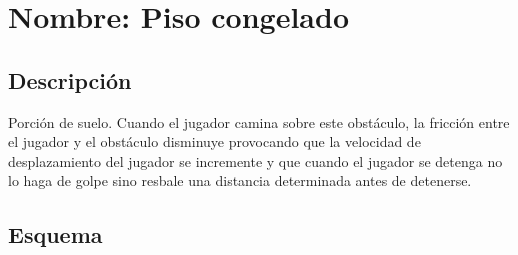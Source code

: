 	\section{Nombre: Piso congelado}\label{obs.pisoC}
	\subsection{Descripción}
	Porción de suelo. Cuando el jugador camina sobre este obstáculo, la fricción entre el jugador y el obstáculo disminuye provocando que la velocidad de desplazamiento del jugador se incremente y que cuando el jugador se detenga no lo haga de golpe sino resbale una distancia determinada antes de detenerse.
	\subsection{Esquema}
